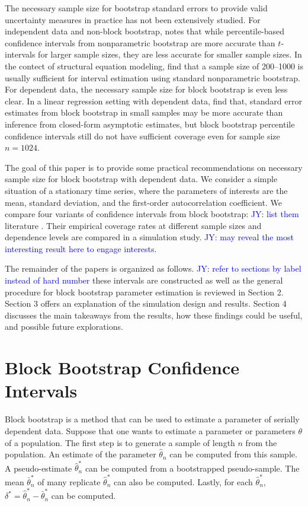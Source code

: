 \documentclass[12pt, letterpaper, titlepage]{article}
\newcommand{\jy}[1]{\textcolor{blue}{JY: #1}}
\begin{document}
The necessary sample size for bootstrap standard errors to provide valid
uncertainty measures in practice has not been extensively studied. For
independent data and non-block bootstrap, \citet{hesterberg2015teachers} notes
that while percentile-based confidence intervals from nonparametric bootstrap
are more accurate than $t$-intervals for larger sample sizes, they are
less accurate for smaller sample sizes. In the contect of structural equation
modeling, \citet{nevitt2001performance} find
that a sample size of 200--1000 is usually sufficient for interval estimation
using standard nonparametric bootstrap. For dependent data, the necessary sample
size for block bootstrap is even less clear. In a linear regression setting with
dependent data, \citet{goncalves2005bootstrap} find that, standard error
estimates from block bootstrap in small samples may be more accurate than
inference from closed-form asymptotic estimates, but block bootstrap percentile
confidence intervals still do not have sufficient coverage even for sample size
$n = 1024$.


The goal of this paper is to provide some practical recommendations on necessary
sample size for block bootstrap with dependent data. We consider a simple
situation of a stationary time series, where the parameters of interests are the
mean, standard deviation, and the first-order autocorrelation coefficient.
We compare four variants of confidence intervals from block bootstrap:
\jy{list them} literature \citep{diciccio1996bootstrap}
\citep{rice2006mathematical}.
Their empirical coverage rates at different sample sizes and dependence levels
are compared in a simulation study.
\jy{may reveal the most interesting result here to engage interests.}



The remainder of the papers is organized as follows.
\jy{refer to sections by label instead of hard number}
these intervals are constructed as well as the general procedure for block
bootstrap parameter estimation is reviewed in Section 2. Section 3 offers an
explanation of the simulation design and results. Section 4 discusses the main
takeaways from the results, how these findings could be useful, and possible
future explorations.


\section{Block Bootstrap Confidence Intervals}
\label{sec:blkbootreview}

Block bootstrap is a method that can be used to estimate a parameter of
serially dependent data. Suppose that one wants to estimate a parameter or
parameters $\theta$ of a population. The first step is to generate a sample of
length $n$ from the population. An estimate of the parameter
$\hat{\theta}_{n}$ can be computed from this sample. A pseudo-estimate
$\hat\theta_n^*$ can be computed from a bootstrapped pseudo-sample. The mean
$\bar\theta_n^*$ of many replicate $\hat\theta_n^*$ can also be computed.
Lastly, for each $\hat\theta_n^*$, $\delta^* = \hat\theta_n^* -
\bar\theta_n^*$ can be computed.
\end{document}
